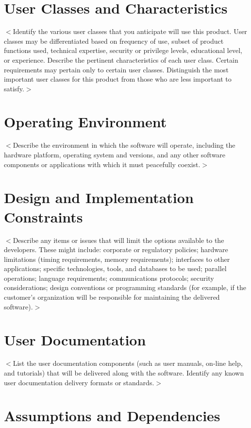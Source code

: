 \documentclass{scrreprt}
\begin{document}
\section{User Classes and Characteristics}
$<$Identify the various user classes that you anticipate will use this product.  
User classes may be differentiated based on frequency of use, subset of product 
functions used, technical expertise, security or privilege levels, educational 
level, or experience. Describe the pertinent characteristics of each user class.  
Certain requirements may pertain only to certain user classes. Distinguish the 
most important user classes for this product from those who are less important 
to satisfy.$>$

\section{Operating Environment}
$<$Describe the environment in which the software will operate, including the 
hardware platform, operating system and versions, and any other software 
components or applications with which it must peacefully coexist.$>$

\section{Design and Implementation Constraints}
$<$Describe any items or issues that will limit the options available to the 
developers. These might include: corporate or regulatory policies; hardware 
limitations (timing requirements, memory requirements); interfaces to other 
applications; specific technologies, tools, and databases to be used; parallel 
operations; language requirements; communications protocols; security 
considerations; design conventions or programming standards (for example, if the 
customer’s organization will be responsible for maintaining the delivered 
software).$>$

\section{User Documentation}
$<$List the user documentation components (such as user manuals, on-line help, 
and tutorials) that will be delivered along with the software. Identify any 
known user documentation delivery formats or standards.$>$
\section{Assumptions and Dependencies}
\end{document}
